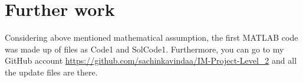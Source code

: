 \documentclass[extendedabs]{AAVL}
\begin{document}
\section{Further work}
Considering above mentioned mathematical assumption, the first MATLAB code was made up of files as Code1 and SolCode1. Furthermore, you can go to my GitHub account \url{https://github.com/sachinkavindaa/IM-Project-Level_2} and all the update files are there.





 
  
\end{document}
